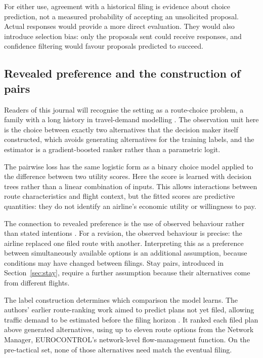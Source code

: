 \documentclass[preprint,authoryear,12pt]{elsarticle}
\begin{document}
For either use, agreement with a historical filing is evidence about
choice prediction, not a measured probability of accepting an unsolicited
proposal. Actual responses would provide a more direct evaluation.
They would also introduce selection bias: only the proposals sent could
receive responses, and confidence filtering would favour proposals predicted to succeed.

\subsection{Revealed preference and the construction of pairs}
\label{sec:pairsvsets}
\label{sec:discrete}

Readers of this journal will recognise the setting as a route-choice
problem, a family with a long history in travel-demand modelling
\citep{mcfadden1974,benakiva1985,train2009}. The observation unit here
is the choice between exactly two alternatives that the decision maker
itself constructed, which avoids generating alternatives for the training labels, and the estimator is a
gradient-boosted ranker rather than a parametric logit.

The pairwise loss has the same logistic form as a binary choice model
applied to the difference between two utility scores. Here the score is
learned with decision trees rather than a linear combination of inputs.
This allows interactions between route characteristics and flight
context, but the fitted scores are predictive quantities: they do not
identify an airline's economic utility or willingness to pay.

The connection to revealed preference is the use of observed behaviour
rather than stated intentions \citep{samuelson1938}. For a revision,
the observed behaviour is precise: the airline replaced one filed route
with another. Interpreting this as a preference between simultaneously
available options is an additional assumption, because conditions may
have changed between filings. Stay pairs, introduced in
Section~\ref{sec:stay}, require a further assumption because their
alternatives come from different flights.

The label construction determines which comparison the model learns.
The authors' earlier route-ranking work aimed to predict plans not yet
filed, allowing traffic demand to be estimated before the filing horizon
\citep{dalmau2024}. It ranked each filed plan above generated alternatives,
using up to eleven route options from the Network Manager, EUROCONTROL's
network-level flow-management function. On the pre-tactical set, none
of those alternatives need match the eventual filing.
\end{document}
